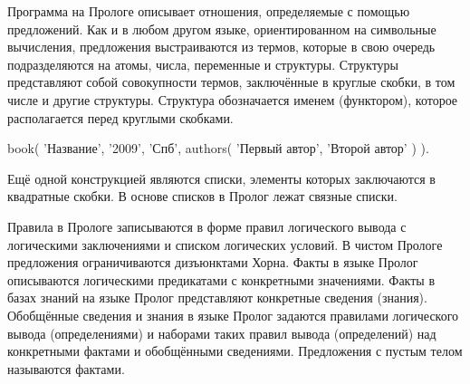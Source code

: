 \hspace{0.6cm}Программа на Прологе описывает отношения, определяемые с помощью предложений. Как и в любом другом языке, ориентированном на символьные вычисления, предложения выстраиваются из термов, которые в свою очередь подразделяются на атомы, числа, переменные и структуры.
\hspace{0.6cm}Структуры представляют собой совокупности термов, заключённые в круглые скобки, в том числе и другие структуры. Структура обозначается именем (функтором), которое располагается перед круглыми скобками.

book( 'Название', '2009', 'Спб', authors( 'Первый автор', 'Второй автор' ) ).

Ещё одной конструкцией являются списки, элементы которых заключаются в квадратные скобки. В основе списков в Пролог лежат связные списки.

\hspace{0.6cm}Правила в Прологе записываются в форме правил логического вывода с логическими заключениями и списком логических условий. В чистом Прологе предложения ограничиваются дизъюнктами Хорна.
\hspace{0.6cm}Факты в языке Пролог описываются логическими предикатами с конкретными значениями. Факты в базах знаний на языке Пролог представляют конкретные сведения (знания). Обобщённые сведения и знания в языке Пролог задаются правилами логического вывода (определениями) и наборами таких правил вывода (определений) над конкретными фактами и обобщёнными сведениями. Предложения с пустым телом называются фактами.


	
